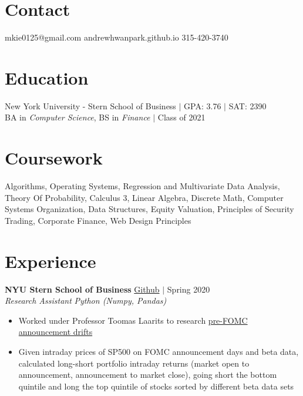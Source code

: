\documentclass[margin]{res}
\begin{document}
 
 
 
\begin{resume} 
	 
	\section{Contact} 
	mkie0125@gmail.com \hfill andrewhwanpark.github.io \hfill 315-420-3740
	
	\section{Education} 
	New York University - Stern School of Business $\vert$ GPA: 3.76 $\vert$ SAT: 2390 \\
	BA in {\it Computer Science}, BS in {\it Finance} $\vert$ Class of 2021
	
	
	\section{Coursework}
	Algorithms, Operating Systems, Regression and Multivariate Data Analysis, Theory Of Probability, Calculus 3, Linear Algebra, Discrete Math, Computer Systems Organization, Data Structures, Equity Valuation, Principles of Security Trading, Corporate Finance, Web Design Principles
	
	\section{Experience}
	{\bf NYU Stern School of Business} \hfill \href{https://github.com/andrewhwanpark/spur}{Github} $\vert$ Spring 2020\\
	{\it Research Assistant} \hfill {\it Python (Numpy, Pandas)}
	\begin{itemize} \itemsep -2pt  %
		\item Worked under Professor Toomas Laarits to research \href{https://www.newyorkfed.org/medialibrary/media/research/staff_reports/sr512.pdf}{pre-FOMC announcement drifts}
		\item Given intraday prices of SP500 on FOMC announcement days and beta data, calculated long-short portfolio intraday returns (market open to announcement, announcement to market close), going short the bottom quintile and long the top quintile of stocks sorted by different beta data sets
	\end{itemize}
	

\end{resume}
\end{document}
